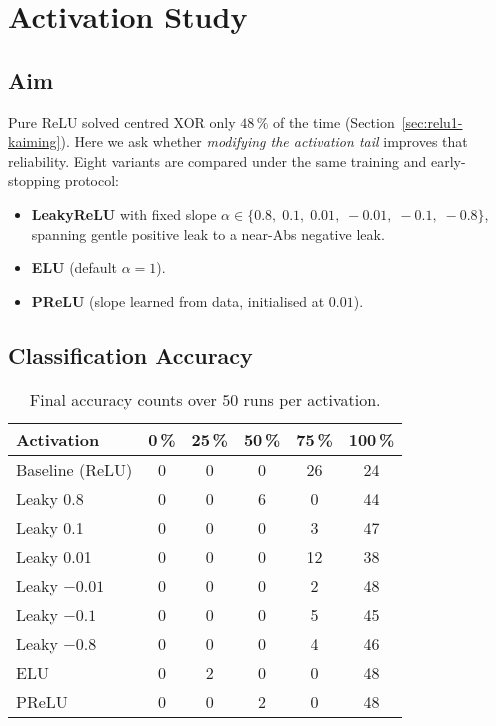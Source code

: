 \section{Activation Study}
\label{sec:relu1-activations}

\subsection*{Aim}
Pure ReLU solved centred XOR only \mbox{$48\,\%$} of the time
(Section~\ref{sec:relu1-kaiming}).  
Here we ask whether \emph{modifying the activation tail} improves that
reliability.
Eight variants are compared under the same training and early-stopping
protocol:

\begin{itemize}
  \item \textbf{LeakyReLU} with fixed slope
        $\alpha\in\{0.8,\;0.1,\;0.01,\;-0.01,\;-0.1,\;-0.8\}$,
        spanning gentle positive leak to a near-Abs negative leak.
  \item \textbf{ELU} (default $\alpha=1$).
  \item \textbf{PReLU} (slope learned from data, initialised at $0.01$).
\end{itemize}

\subsection*{Classification Accuracy}

\begin{table}[h]
\centering
\caption{Final accuracy counts over $50$ runs per activation.}
\label{tab:relu1-activation-accuracy}
\begin{tabular}{lccccc}
\toprule
Activation & 0\,\% & 25\,\% & 50\,\% & 75\,\% & 100\,\% \\
\midrule
Baseline (ReLU) & 0 & 0 & 0 & 26 & 24 %
\\
Leaky 0.8  & 0 & 0 & 6 & 0 & 44 \\
Leaky 0.1  & 0 & 0 & 0 & 3 & 47 \\
Leaky 0.01 & 0 & 0 & 0 & 12 & 38 \\
Leaky $-0.01$ & 0 & 0 & 0 & 2 & 48 \\
Leaky $-0.1$  & 0 & 0 & 0 & 5 & 45 \\
Leaky $-0.8$  & 0 & 0 & 0 & 4 & 46 \\
ELU          & 0 & 2 & 0 & 0 & 48 \\
PReLU        & 0 & 0 & 2 & 0 & 48 \\
\bottomrule
\end{tabular}
\end{table}

